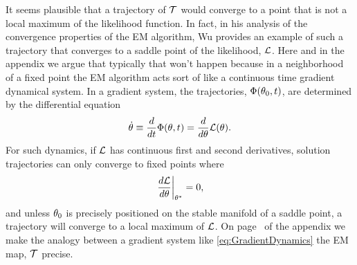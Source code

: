 It seems plausible that a trajectory of $\EMmap$ would converge to a
point that is not a local maximum of the likelihood function.  In
fact, in his analysis of the convergence properties of the EM
algorithm, Wu\cite{Wu83} provides an example of such a trajectory that
converges to a saddle point of the likelihood, $\LikelihoodFunction$.
Here and in the appendix we argue that typically that won't happen
because in a neighborhood of a fixed point the EM algorithm acts sort
of like a continuous time gradient dynamical system.  In a gradient
system, the trajectories, $\Phi(\theta_0, t)$, are determined by
the differential equation
\begin{equation}
  \label{eq:GradientDynamics}
  \dot \parameters \equiv \frac{d}{d t} \Phi(\parameters, t) =  \frac{d}{d \parameters} \LikelihoodFunction(\parameters).
\end{equation}
For such dynamics, if $\LikelihoodFunction$ has continuous first and
second derivatives, solution trajectories can only converge to fixed
points where
\begin{equation*}
  \left. \frac{d \LikelihoodFunction}{d \parameters} \right|_\EMfixedPoint = 0,
\end{equation*}
and unless $\theta_0$ is precisely positioned on the stable
manifold of a saddle point, a trajectory will converge to a local
maximum of $\LikelihoodFunction$.  On page~\pageref{chap:em_appendix}
of the appendix we make the analogy between a gradient system like
\eqref{eq:GradientDynamics} the EM map, $\EMmap$ precise.

